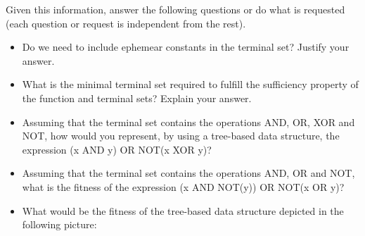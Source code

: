 \documentclass{article}
\begin{document}
Given this information, answer the following questions or do what is requested (each question or request is independent from the rest).
\begin{itemize}
    \item Do we need to include ephemear constants in the terminal set? Justify your answer.
    \item What is the minimal terminal set required to fulfill the sufficiency property of the function and terminal     sets? Explain your answer.
    \item Assuming that the terminal set contains the operations AND, OR, XOR and NOT, how would you represent, by using a tree-based data structure, the expression (x AND y) OR NOT(x XOR y)?
    \item Assuming that the terminal set contains the operations AND, OR and NOT, what is the fitness of the expression (x AND NOT(y)) OR NOT(x OR y)?
    \item What would be the fitness of the tree-based data structure depicted in the following picture:
\end{itemize}
\end{document}
